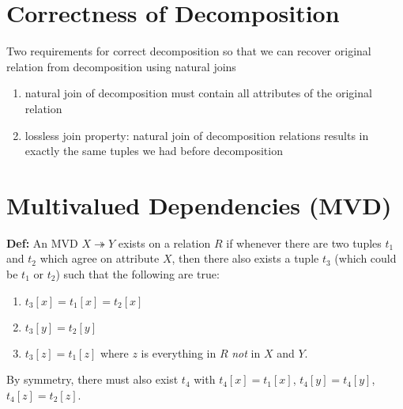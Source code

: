 \documentclass{../cheatsheet}
\begin{document}
\begin{multicols*}{2}
\section{Correctness of Decomposition}
Two requirements for correct decomposition so that we can recover original
relation from decomposition using natural joins

\begin{enumerate}
    \item natural join of decomposition must contain all attributes of the
        original relation
    \item lossless join property: natural join of decomposition relations
        results in exactly the same tuples we had before decomposition
\end{enumerate}

\section{Multivalued Dependencies (MVD)}
\textbf{Def:} An MVD $X \twoheadrightarrow Y$ exists on a relation $R$ if
whenever there are two tuples $t_1$ and $t_2$ which agree on attribute $X$, then
there also exists a tuple $t_3$ (which could be $t_1$ or $t_2$) such that the
following are true:

\begin{enumerate}
    \item $t_3[x] = t_1[x] = t_2[x]$
    \item $t_3[y] = t_2[y]$
    \item $t_3[z] = t_1[z]$ where $z$ is everything in $R$ \textit{not} in $X$
        and $Y$.
\end{enumerate}

By symmetry, there must also exist $t_4$ with $t_4[x] = t_1[x]$, $t_4[y] =
t_4[y]$, $t_4[z] = t_2[z]$.

\end{multicols*}
\end{document}
